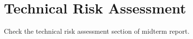 \section{Technical Risk Assessment}
\label{TRA}
Check the technical risk assessment section of midterm report.  